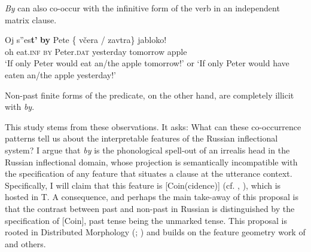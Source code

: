 \documentclass[output=paper,
modfonts,
newtxmath,
hidelinks,
]{langscibook}
\begin{document}
\noindent \textit{By} can also co-occur with the infinitive form of the verb in an independent matrix clause.

\ea \label{ex3}
\gll Oj s”es\textbf{t’} \textbf{by} Pete \{\hspace{-2pt} včera / zavtra\} jabloko!\\
     oh eat.\textsc{inf} \textsc{by} Peter.\textsc{dat} {} yesterday {} tomorrow apple\\
\glt `If only Peter would eat an/the apple tomorrow!' or
\glt `If only Peter would have eaten an/the apple yesterday!'\\\hfill \citep[10]{Asarina2006}
\z

\noindent Non-past finite forms of the predicate, on the other hand, are completely illicit with \textit{by}.

\ea \label{ex4}
	\z
\z

\noindent This study stems from these observations. It asks: What can these co-occurrence patterns tell us about the interpretable features of the Russian inflectional system? I argue that \textit{by} is the phonological spell-out of an irrealis head in the Russian inflectional domain, whose projection is semantically incompatible with the specification of any feature that situates a clause at the utterance context. Specifically, I will claim that this feature is [Coin(cidence)] (cf. \citealt{RitterWiltschko2005}, \citealt{RitterWiltschko2009}), which is hosted in T. A consequence, and perhaps the main take-away of this proposal is that the contrast between past and non-past in Russian is distinguished by the specification of [Coin], past tense being the unmarked tense. This proposal is rooted in Distributed Morphology (\citealt{HalleMarantz1993}; \citealt{EmbickNoyer2007}) and builds on the feature geometry work of \citet{Cowper2002,Cowper2005} and others.
\end{document}
